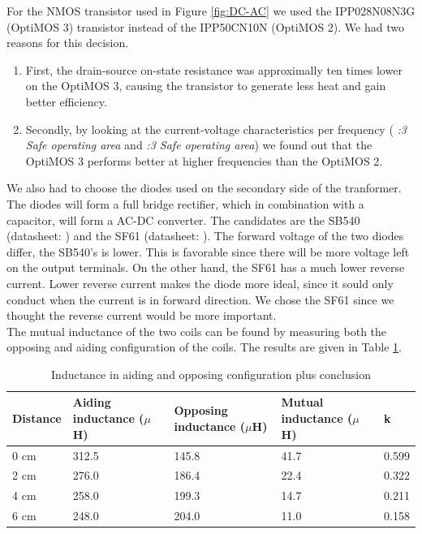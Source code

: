 \documentclass[final]{scrreprt} %
\begin{document}
For the NMOS transistor used in Figure \ref{fig:DC-AC} we used the IPP028N08N3G (OptiMOS 3) transistor instead of the IPP50CN10N (OptiMOS 2).
We had two reasons for this decision.
\begin{enumerate}
\item First, the drain-source on-state resistance was approximally ten times lower on the OptiMOS 3, causing the transistor to generate less heat and gain better efficiency.
\item Secondly, by looking at the current-voltage characteristics per frequency (\cite{OptiMOS2} \emph{:3 Safe operating area} and \cite{OptiMOS3} \emph{:3 Safe operating area}) we found out that the OptiMOS 3 performs better at higher frequencies than the OptiMOS 2.
\end{enumerate}
We also had to choose the diodes used on the secondary side of the tranformer. The diodes will form a full bridge rectifier, which in combination with a capacitor, will form a AC-DC converter.
The candidates are the SB540 (datasheet: \cite{SB540}) and the SF61 (datasheet: \cite{SF61}).
The forward voltage of the two diodes differ, the SB540's is lower. This is favorable since there will be more voltage left on the output terminals.
On the other hand, the SF61 has a much lower reverse current. Lower reverse current makes the diode more ideal, since it sould only conduct when the current is in forward direction.
We chose the SF61 since we thought the reverse current would be more important.
\\


The mutual inductance of the two coils can be found by measuring both the opposing and aiding configuration of the coils. The results are given in Table \ref{tab:inductances}.

\begin{table} [h]
\begin{center}
	\begin{tabular}{ l | l | l | l | l }
	Distance & Aiding inductance ($\mu$H) & Opposing inductance ($\mu$H) & Mutual inductance ($\mu$H) & k \\ \hline
  	0 cm & 312.5 & 145.8 & 41.7 & 0.599 \\
	2 cm & 276.0 & 186.4 & 22.4 & 0.322 \\
	4 cm & 258.0 & 199.3 & 14.7 & 0.211 \\
	6 cm & 248.0 & 204.0 & 11.0 & 0.158 \\
	\end{tabular}
	\caption{Inductance in aiding and opposing configuration plus conclusion}
	\label{tab:inductances}
\end{center}
\end{table}
\end{document}
